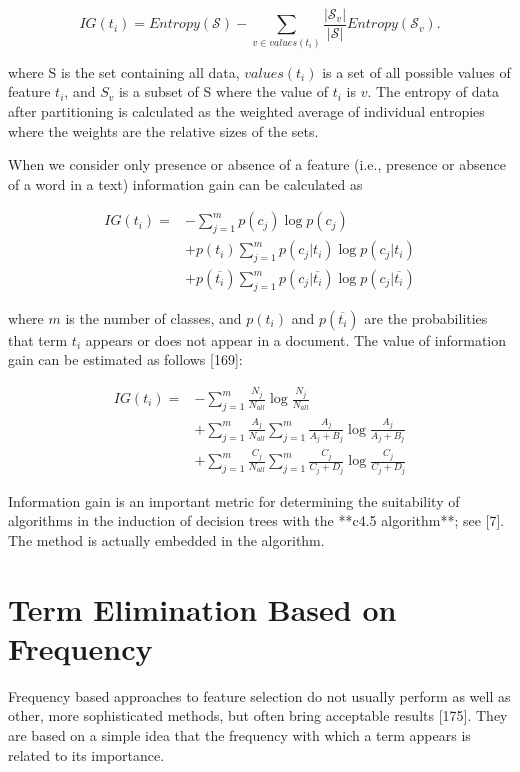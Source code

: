 \documentclass[11pt,openany,executivepaper]{book}
\begin{document}
\begin{equation}
    IG(t_i) = Entropy(\mathcal{S}) - \sum_{v \in values(t_i)} \frac{|\mathcal{S}_v|}{|\mathcal{S}|} Entropy(\mathcal{S}_v).
\end{equation}

where S is the set containing all data, $values(t_i)$ is a set of all possible values of feature $t_i$, and $S_v$ is a subset of S where the value of $t_i$ is $v$. The entropy of data after partitioning is calculated as the weighted average of individual entropies where the weights are the relative sizes of the sets.

When we consider only presence or absence of a feature (i.e., presence or absence of a word in a text) information gain can be calculated as

\begin{align}
    IG(t_i) = & -\sum_{j=1}^{m} p(c_j) \log p(c_j) \nonumber \\
    & + p(t_i) \sum_{j=1}^{m} p(c_j|t_i) \log p(c_j|t_i) \nonumber \\
    & + p(\overline{t_i}) \sum_{j=1}^{m} p(c_j|\overline{t_i}) \log p(c_j|\overline{t_i})
\end{align}

where $m$ is the number of classes, and $p(t_i)$ and $p(\overline{t_i})$ are the probabilities that term $t_i$ appears or does not appear in a document.
The value of information gain can be estimated as follows [169]:

\begin{align}
    IG(t_i) = & -\sum_{j=1}^{m} \frac{N_j}{N_{all}} \log \frac{N_j}{N_{all}} \nonumber \\
    & + \sum_{j=1}^{m} \frac{A_j}{N_{all}} \sum_{j=1}^{m} \frac{A_j}{A_j+B_j} \log \frac{A_j}{A_j+B_j} \nonumber \\
    & + \sum_{j=1}^{m} \frac{C_j}{N_{all}} \sum_{j=1}^{m} \frac{C_j}{C_j+D_j} \log \frac{C_j}{C_j+D_j}
\end{align}

Information gain is an important metric for determining the suitability of algorithms in the induction of decision trees with the **c4.5 algorithm**; see [7]. The method is actually embedded in the algorithm.

\section{Term Elimination Based on Frequency}

Frequency based approaches to feature selection do not usually perform as well as other, more sophisticated methods, but often bring acceptable results [175]. They are based on a simple idea that the frequency with which a term appears is related to its importance.
\end{document}
